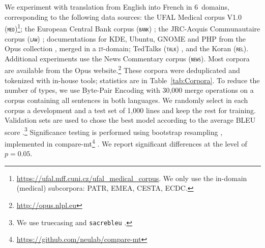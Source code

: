 \documentclass[11pt]{article}
\newcommand{\fyDone}[1]{\done[FY]\Todo[FY:]{\textcolor{orange}{#1}}}
\newcommand{\domain}[1]{\texttt{\textsc{#1}}}
\begin{document}
We experiment with translation from English into French in 6~domains, corresponding to the following data sources: the UFAL Medical corpus V1.0 (\domain{med})\footnote{\url{https://ufal.mff.cuni.cz/ufal_medical_corpus}. We only use the in-domain (medical) subcorpora: PATR, EMEA, CESTA, ECDC.}; the European Central Bank corpus (\domain{bank}) \cite{Tiedemann12parallel}; the JRC-Acquis Communautaire corpus (\domain{law}) \cite{Steinberger06acquis}; documentations for KDE, Ubuntu, GNOME and PHP from the Opus collection \cite{Tiedemann09news}, merged in a \domain{it}-domain; TedTalks (\domain{talk}) \cite{Cettolo12wit}, and the Koran (\domain{rel}). Additional experiments use the News Commentary corpus (\domain{news}). Most corpora are available from the Opus website.\footnote{\url{http://opus.nlpl.eu}} These corpora were deduplicated and tokenized with in-house tools; statistics are in Table~\ref{tab:Corpora}. To reduce the number of types, we use Byte-Pair Encoding \cite{Sennrich16BPE} with 30,000 merge operations on a corpus containing all sentences in both languages.\fyDone{Add \# number of tokens, also specificity ?}%
%
We randomly select in each corpus a development and a test set of 1,000 lines and keep the rest for training. Validation sets are used to chose the best model according to the average BLEU score \cite{Papineni02bleu}.\footnote{We use truecasing and \texttt{sacrebleu} \cite{Post18call}.}\fyDone{A word about meta-parameter settings} Significance testing is performed using bootstrap resampling \cite{Koehn04statistical}, implemented in compare-mt\footnote{\url{https://github.com/neulab/compare-mt}} \cite{Neubig19compare-mt}. We report significant differences at the level of $p=0.05$.\fyDone{Fix correct p value}
\end{document}
